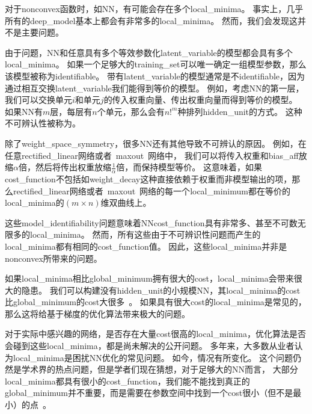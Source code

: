 对于\gls{nonconvex}函数时，如\gls{NN}，有可能会存在多个\gls{local_minima}。
事实上，几乎所有的\gls{deep_model}基本上都会有非常多的\gls{local_minima}。
然而，我们会发现这并不是主要问题。


由于问题，\gls{NN}和任意具有多个等效参数化\gls{latent_variable}的模型都会具有多个\gls{local_minima}。
如果一个足够大的\gls{training_set}可以唯一确定一组模型参数，那么该模型被称为\gls{identifiable}。
带有\gls{latent_variable}的模型通常是不\gls{identifiable}，因为通过相互交换\gls{latent_variable}我们能得到等价的模型。
例如，考虑\gls{NN}的第一层，我们可以交换单元$i$和单元$j$的传入权重向量、传出权重向量而得到等价的模型。
如果\gls{NN}有$m$层，每层有$n$个单元，那么会有$n!^m$种排列\gls{hidden_unit}的方式。
这种不可辨认性被称为。


除了\gls{weight_space_symmetry}，很多\gls{NN}还有其他导致不可辨认的原因。
例如，在任意\gls{rectified_linear}网络或者~\gls{maxout}~网络中，
我们可以将传入权重和\gls{bias_aff}放缩$\alpha$倍，然后将传出权重放缩$\frac{1}{\alpha}$倍，而保持模型等价。
这意味着，如果\gls{cost_function}不包括如\gls{weight_decay}这种直接依赖于权重而非模型输出的项，那么\gls{rectified_linear}网络或者~\gls{maxout}~网络的每一个\gls{local_minimum}都在等价的\gls{local_minima}的$(m\times n)$维双曲线上。


这些\gls{model_identifiability}问题意味着\gls{NN}\gls{cost_function}具有非常多、甚至不可数无限多的\gls{local_minima}。
然而，所有这些由于不可辨识性问题而产生的\gls{local_minima}都有相同的\gls{cost_function}值。
因此，这些\gls{local_minima}并非是\gls{nonconvex}所带来的问题。


如果\gls{local_minima}相比\gls{global_minimum}拥有很大的\gls{cost}，\gls{local_minima}会带来很大的隐患。
我们可以构建没有\gls{hidden_unit}的小规模\gls{NN}，其\gls{local_minima}的\gls{cost}比\gls{global_minimum}的\gls{cost}大很多~\citep{Sontag-cs89,Brady89,Gori-pami91}。
如果具有很大\gls{cost}的\gls{local_minima}是常见的，那么这将给基于梯度的优化算法带来极大的问题。


对于实际中感兴趣的网络，是否存在大量\gls{cost}很高的\gls{local_minima}，优化算法是否会碰到这些\gls{local_minima}，都是尚未解决的公开问题。
多年来，大多数从业者认为\gls{local_minima}是困扰\gls{NN}优化的常见问题。
如今，情况有所变化。
这个问题仍然是学术界的热点问题，但是学者们现在猜想，对于足够大的\gls{NN}而言，
大部分\gls{local_minima}都具有很小的\gls{cost_function}，我们能不能找到真正的\gls{global_minimum}并不重要，而是需要在参数空间中找到一个\gls{cost}很小（但不是最小）的点~\citep{Saxe-et-al-ICLR13,Dauphin-et-al-NIPS2014-small,GoodfellowOptimization15,Choromanska-et-al-AISTATS2015}。

